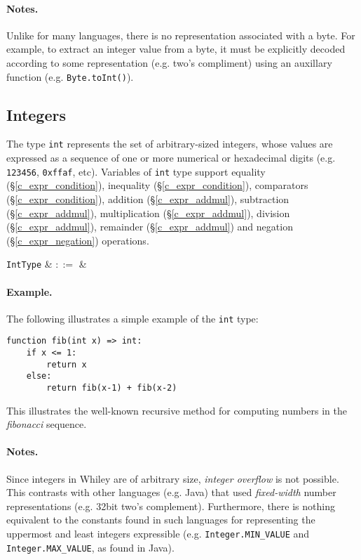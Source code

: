 \paragraph{Notes.}  Unlike for many languages, there is no representation associated with a byte. For example, to extract an integer value from a byte, it must be explicitly decoded according to some representation (e.g. two's compliment) using an auxillary function (e.g. \lstinline{Byte.toInt()}).



\subsection{Integers}
\label{c_types_int}

The type \lstinline{int} represents the set of arbitrary-sized integers, whose values are expressed as a sequence of one or more numerical or hexadecimal digits (e.g. \lstinline{123456}, \lstinline{0xffaf}, etc).  Variables of \lstinline{int} type support equality (\S\ref{c_expr_condition}), inequality (\S\ref{c_expr_condition}), comparators (\S\ref{c_expr_condition}), addition (\S\ref{c_expr_addmul}), subtraction (\S\ref{c_expr_addmul}), multiplication (\S\ref{c_expr_addmul}), division (\S\ref{c_expr_addmul}), remainder (\S\ref{c_expr_addmul}) and negation (\S\ref{c_expr_negation}) operations.


\begin{syntax}
  \verb+IntType+ & $::=$ &  \\
\end{syntax}

\paragraph{Example.} The following illustrates a simple example of the \lstinline{int} type:

\begin{lstlisting}
function fib(int x) => int:
    if x <= 1:
        return x
    else:
        return fib(x-1) + fib(x-2)
\end{lstlisting}
This illustrates the well-known recursive method for computing numbers in the {\em fibonacci} sequence.

\paragraph{Notes.}  Since integers in Whiley are of arbitrary size, {\em integer overflow} is not possible.  This contrasts with other languages (e.g. Java) that used {\em fixed-width} number representations (e.g. 32bit two's complement).  Furthermore, there is nothing equivalent to the constants found in such languages for representing the uppermost and least integers expressible (e.g. \lstinline{Integer.MIN_VALUE} and \lstinline{Integer.MAX_VALUE}, as found in Java).

